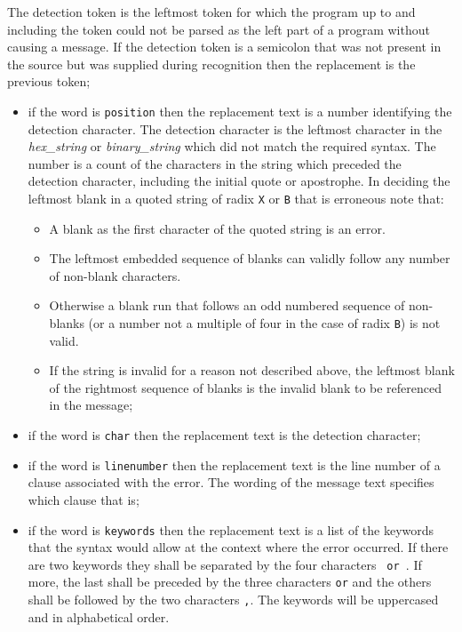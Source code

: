 The detection token is the leftmost token for which the program up to
and including the token could not be parsed as the left part of a
program without causing a message. If the detection token is a semicolon
that was not present in the source but was supplied during recognition
then the replacement is the previous token;

\begin{itemize}
\item
  if the word is \texttt{\textquotesingle{}position\textquotesingle{}}
  then the replacement text is a number identifying the detection
  character. The detection character is the leftmost character in the
  \emph{hex\_string} or \emph{binary\_string} which did not match the
  required syntax. The number is a count of the characters in the string
  which preceded the detection character, including the initial quote or
  apostrophe. In deciding the leftmost blank in a quoted string of radix
  \texttt{\textquotesingle{}X\textquotesingle{}} or
  \texttt{\textquotesingle{}B\textquotesingle{}} that is erroneous note
  that:

  \begin{itemize}
  \item
    A blank as the first character of the quoted string is an error.
  \item
    The leftmost embedded sequence of blanks can validly follow any
    number of non-blank characters.
  \item
    Otherwise a blank run that follows an odd numbered sequence of
    non-blanks (or a number not a multiple of four in the case of radix
    \texttt{\textquotesingle{}B\textquotesingle{}}) is not valid.
  \item
    If the string is invalid for a reason not described above, the
    leftmost blank of the rightmost sequence of blanks is the invalid
    blank to be referenced in the message;
  \end{itemize}
\item
  if the word is \texttt{\textquotesingle{}char\textquotesingle{}} then
  the replacement text is the detection character;
\item
  if the word is \texttt{\textquotesingle{}linenumber\textquotesingle{}}
  then the replacement text is the line number of a clause associated
  with the error. The wording of the message text specifies which clause
  that is;
\item
  if the word is \texttt{\textquotesingle{}keywords\textquotesingle{}}
  then the replacement text is a list of the keywords that the syntax
  would allow at the context where the error occurred. If there are two
  keywords they shall be separated by the four characters
  \texttt{\textquotesingle{}\ or\ \textquotesingle{}}. If more, the last
  shall be preceded by the three characters
  \texttt{\textquotesingle{}or\textquotesingle{}} and the others shall
  be followed by the two characters
  \texttt{\textquotesingle{},\textquotesingle{}}. The keywords will be
  uppercased and in alphabetical order.
\end{itemize}

